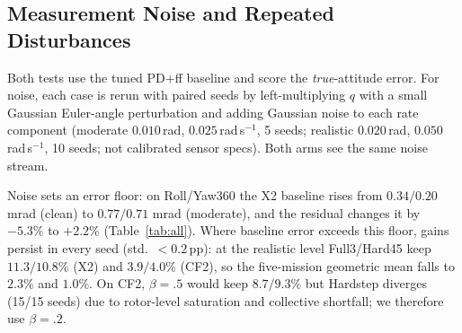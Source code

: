 \documentclass[letterpaper, 10 pt, conference]{ieeeconf}
\begin{document}


\subsection{Measurement Noise and Repeated Disturbances}
\label{sec:noise}
Both tests use the tuned PD+ff baseline and score the \emph{true}-attitude error. For noise, each case is rerun with paired seeds by left-multiplying $q$ with a small Gaussian Euler-angle perturbation and adding Gaussian noise to each rate component (moderate $0.010$\,rad, $0.025$\,rad\,s$^{-1}$, 5 seeds; realistic $0.020$\,rad, $0.050$\,rad\,s$^{-1}$, 10 seeds; not calibrated sensor specs). Both arms see the same noise stream.

Noise sets an error floor: on Roll/Yaw360 the X2 baseline rises from $0.34/0.20$ mrad (clean) to $0.77/0.71$ mrad (moderate), and the residual changes it by $-5.3\%$ to $+2.2\%$ (Table~\ref{tab:all}). Where baseline error exceeds this floor, gains persist in every seed (std.\ $<0.2$\,pp): at the realistic level Full3/Hard45 keep $11.3/10.8\%$ (X2) and $3.9/4.0\%$ (CF2), so the five-mission geometric mean falls to $2.3\%$ and $1.0\%$. On CF2, $\beta=.5$ would keep $8.7/9.3\%$ but Hardstep diverges (15/15 seeds) due to rotor-level saturation and collective shortfall; we therefore use $\beta=.2$.
\end{document}
